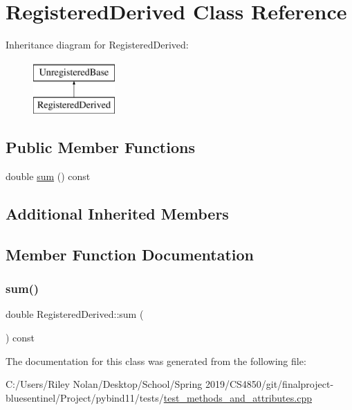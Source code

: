 \hypertarget{class_registered_derived}{}\section{Registered\+Derived Class Reference}
\label{class_registered_derived}
Inheritance diagram for Registered\+Derived\+:\begin{figure}[H]
\begin{center}
\leavevmode
\includegraphics[height=2.000000cm]{class_registered_derived}
\end{center}
\end{figure}
\subsection*{Public Member Functions}
\begin{DoxyCompactItemize}
\item 
double \mbox{\hyperlink{class_registered_derived_a3dd973cfe60a9b1a0c2d549f4874dc14}{sum}} () const
\end{DoxyCompactItemize}
\subsection*{Additional Inherited Members}


\subsection{Member Function Documentation}
\mbox{\label{class_registered_derived_a3dd973cfe60a9b1a0c2d549f4874dc14}} 
\subsubsection{\texorpdfstring{sum()}{sum()}}
{\footnotesize\ttfamily double Registered\+Derived\+::sum (\begin{DoxyParamCaption}{ }\end{DoxyParamCaption}) const\hspace{0.3cm}{\ttfamily [inline]}}



The documentation for this class was generated from the following file\+:\begin{DoxyCompactItemize}
\item 
C\+:/\+Users/\+Riley Nolan/\+Desktop/\+School/\+Spring 2019/\+C\+S4850/git/finalproject-\/bluesentinel/\+Project/pybind11/tests/\mbox{\hyperlink{test__methods__and__attributes_8cpp}{test\+\_\+methods\+\_\+and\+\_\+attributes.\+cpp}}\end{DoxyCompactItemize}

